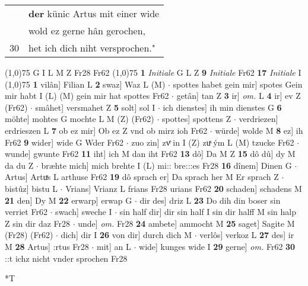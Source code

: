 \documentclass[8pt,a4paper,notitlepage]{article}
\begin{document}
\begin{table}[ht]
\begin{minipage}[t]{0.5\linewidth}
\begin{tabular}{rl}
 & \textbf{der} künic Artus mit einer wide\\ 
 & wold ez gerne hân gerochen,\\ 
30 & het ich dich niht versprochen."\\ 
\end{tabular}
\scriptsize
\line(1,0){75} \newline
G I L M Z Fr28 Fr62 \newline
\line(1,0){75} \newline
\textbf{1} \textit{Initiale} G L Z  \textbf{9} \textit{Initiale} Fr62  \textbf{17} \textit{Initiale} I  \newline
\line(1,0){75} \newline
\textbf{1} vilân] Filian L \textbf{2} swaz] Waz L (M)  $\cdot$ spottes habet gein mir] spotes Gein mir habt I (L) (M) gein mir hat spottes Fr62  $\cdot$ getân] tan Z \textbf{3} ir] \textit{om.} L \textbf{4} ir] ev Z (Fr62)  $\cdot$ smâhet] versmahet Z \textbf{5} solt] sol I  $\cdot$ ich dienstes] ih min dienstes G \textbf{6} möhte] mohtes G mochte L M (Z) (Fr62)  $\cdot$ spottes] spottens Z  $\cdot$ verdriezen] erdrieszen L \textbf{7} ob ez mir] Ob ez Z vnd ob mirz ioh Fr62  $\cdot$ würde] wolde M \textbf{8} ez] ih Fr62 \textbf{9} wider] wide G Wder Fr62  $\cdot$ zuo zin] zvͤ in I (Z) zuͯ ým L (M) tzucke Fr62  $\cdot$ wunde] gwunte Fr62 \textbf{11} iht] ich M dan iht Fr62 \textbf{13} dô] Da M Z \textbf{15} dô dû] dy M da du Z  $\cdot$ bræhte mich] mich brehte I (L) mi:: bre:::es Fr28 \textbf{16} dînem] Dinen G  $\cdot$ Artus] Artuͯs L arthuse Fr62 \textbf{19} dô sprach er] Da sprach her M Er sprach Z  $\cdot$ bistûz] bistu L  $\cdot$ Vrians] Vrianz L frians Fr28 urians Fr62 \textbf{20} schaden] schadens M \textbf{21} den] Dy M \textbf{22} erwarp] erwap G  $\cdot$ dir des] driz L \textbf{23} Do dih din boser sin verriet Fr62  $\cdot$ swach] sweche I  $\cdot$ sin half dir] dir sin half I sin dir halff M sin halp Z sin dir daz Fr28  $\cdot$ unde] \textit{om.} Fr28 \textbf{24} ambete] ammocht M \textbf{25} saget] Sagite M (Fr28) (Fr62)  $\cdot$ dich] dir I \textbf{26} von dir] durch dich M  $\cdot$ verlôs] verkoz L \textbf{27} des] ir M \textbf{28} Artus] :rtus Fr28  $\cdot$ mit] an L  $\cdot$ wide] kunges wide I \textbf{29} gerne] \textit{om.} Fr62 \textbf{30} ::t ichz nicht vnder sprochen Fr28 \newline
\end{minipage}
\hspace{0.5cm}
\begin{minipage}[t]{0.5\linewidth}
\small
\begin{center}*T

\end{center}
\end{minipage}
\end{table}
\end{document}
